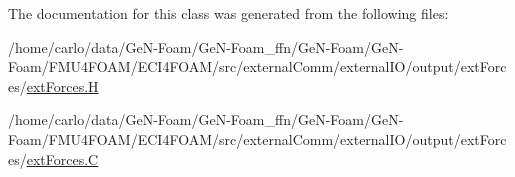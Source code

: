 The documentation for this class was generated from the following files\+:\begin{DoxyCompactItemize}
\item 
/home/carlo/data/\+Ge\+N-\/\+Foam/\+Ge\+N-\/\+Foam\+\_\+ffn/\+Ge\+N-\/\+Foam/\+Ge\+N-\/\+Foam/\+F\+M\+U4\+F\+O\+A\+M/\+E\+C\+I4\+F\+O\+A\+M/src/external\+Comm/external\+I\+O/output/ext\+Forces/\hyperlink{extForces_8H}{ext\+Forces.\+H}\item 
/home/carlo/data/\+Ge\+N-\/\+Foam/\+Ge\+N-\/\+Foam\+\_\+ffn/\+Ge\+N-\/\+Foam/\+Ge\+N-\/\+Foam/\+F\+M\+U4\+F\+O\+A\+M/\+E\+C\+I4\+F\+O\+A\+M/src/external\+Comm/external\+I\+O/output/ext\+Forces/\hyperlink{extForces_8C}{ext\+Forces.\+C}\end{DoxyCompactItemize}
